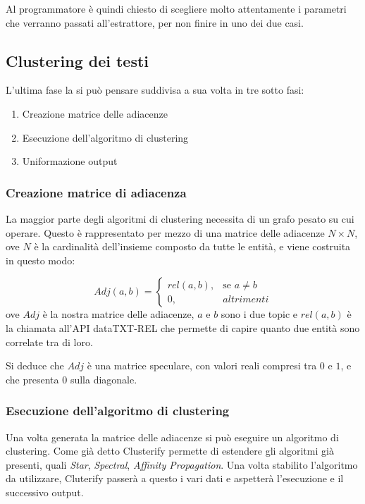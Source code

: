 		Al programmatore è quindi chiesto di scegliere molto attentamente i parametri che verranno passati all'estrattore, per non finire in uno dei due casi.

	\subsection{Clustering dei testi}
		L'ultima fase la si può pensare suddivisa a sua volta in tre sotto fasi:

		\begin{enumerate}
  			\item Creazione matrice delle adiacenze
  			\item Esecuzione dell'algoritmo di clustering
 			\item Uniformazione output
		\end{enumerate} 

		\subsubsection{Creazione matrice di adiacenza}
			La maggior parte degli algoritmi di clustering necessita di un grafo pesato su cui operare. Questo è rappresentato per mezzo di una matrice delle adiacenze $N \times N$, ove $N$ è la cardinalità dell'insieme composto da tutte le entità, e viene costruita in questo modo:

			\begin{equation*}
				Adj(a, b) = \begin{cases} 
					rel(a,b), & \mbox{se } a \neq b \\ 
					0, & altrimenti 
				\end{cases}
			\end{equation*}
			ove $Adj$ è la nostra matrice delle adiacenze, $a$ e $b$ sono i due topic e $rel(a,b)$ è la chiamata all'API dataTXT-REL che permette di capire quanto due entità sono correlate tra di loro.
			
			Si deduce che $Adj$ è una matrice speculare, con valori reali compresi tra $0$ e $1$, e che presenta $0$ sulla diagonale.

		\subsubsection{Esecuzione dell'algoritmo di clustering}
			Una volta generata la matrice delle adiacenze si può eseguire un algoritmo di clustering. Come già detto Clusterify permette di estendere gli algoritmi già presenti, quali \emph{Star}, \emph{Spectral}, \emph{Affinity Propagation}. Una volta stabilito l'algoritmo da utilizzare, Cluterify passerà a questo i vari dati e aspetterà l'esecuzione e il successivo output.

